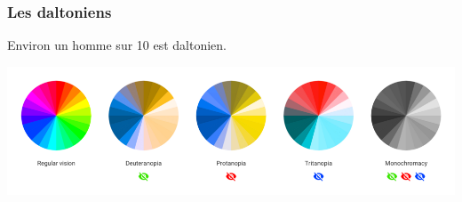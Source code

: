 \documentclass[aspectratio=169]{beamer}
\begin{document}
\begin{frame}[c]\frametitle{Les daltoniens}

Environ un homme sur 10 est daltonien. 

\begin{center}
  \includegraphics[width=1\textwidth]{figures/colorblindness-comparison.png}
\end{center}

\end{frame}
\end{document}
